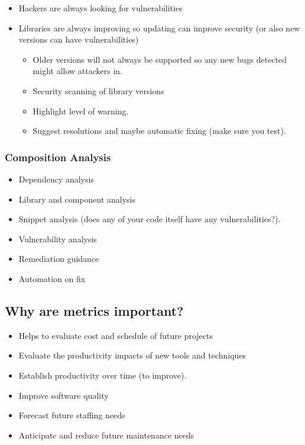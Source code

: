 \begin{itemize}
    \item Hackers are always looking for vulnerabilities
    \item Libraries are always improving so updating can improve security (or also new versions can have vulnerabilities)
          \begin{itemize}
              \item Older versions will not always be supported so any new bugs detected might allow attackers in.
              \item Security scanning of library versions
              \item Highlight level of warning.
              \item Suggest resolutions and maybe automatic fixing (make sure you test).
          \end{itemize}
\end{itemize}

\subsubsection{Composition Analysis}\label{ssub:composition_analysis}

\begin{itemize}
    \item Dependency analysis
    \item Library and component analysis
    \item Snippet analysis (does any of your code itself have any vulnerabilities?).
    \item Vulnerability analysis
    \item Remediation guidance
    \item Automation on fix
\end{itemize}

\subsection{Why are metrics important?}\label{sub:why_are_metrics_important_}

\begin{itemize}
    \item Helps to evaluate cost and schedule of future projects
    \item Evaluate the productivity impacts of new tools and techniques
    \item Establish productivity over time (to improve).
    \item Improve software quality
    \item Forecast future staffing needs
    \item Anticipate and reduce future maintenance needs
\end{itemize}

